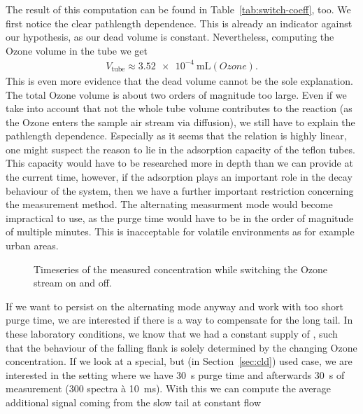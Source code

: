The result of this computation can be found in
Table~\ref{tab:switch-coeff}, too. We first notice the clear
pathlength dependence. This is already an indicator against our
hypothesis, as our dead volume is constant. Nevertheless, computing
the Ozone volume in the tube we get
\begin{align*}
  V_{\text{tube}} \approx \SI{3.52e-4}{\milli\liter(Ozone)}.
\end{align*}
This is even more evidence that the dead volume cannot be the sole
explanation. The total Ozone volume is about two orders of magnitude
too large. Even if we take into account that not the whole tube volume
contributes to the reaction (as the Ozone enters the sample air stream
via diffusion), we still have to explain the pathlength
dependence. Especially as it seems that the relation is highly linear,
one might suspect the reason to lie in the adsorption capacity of the
teflon tubes. This capacity would have to be researched more in depth
than we can provide at the current time, however, if the adsorption
plays an important role in the decay behaviour of the system, then we
have a further important restriction concerning the measurement
method. The alternating measurment mode would become impractical to
use, as the purge time would have to be in the order of magnitude of
multiple minutes. This is inacceptable for volatile environments as
for example urban areas.

\begin{figure}[htbp]
  \centering
  
  \caption{Timeseries of the measured  concentration while
    switching the Ozone stream on and off.}
  \label{fig:switch}
\end{figure}
If we want to persist on the alternating mode anyway and work with too
short purge time, we are interested if there is a way to compensate
for the long tail. In these laboratory conditions, we know that we had
a constant supply of , such that the behaviour of the falling
flank is solely determined by the changing Ozone concentration. If we
look at a special, but (in Section~\ref{sec:cld}) used case, we are
interested in the setting where we have \SI{30}{\second} purge time
and afterwards \SI{30}{\second} of measurement (300 spectra à
\SI{10}{\milli\second}). With this we can compute the average additional
 signal coming from the slow tail at constant  flow

